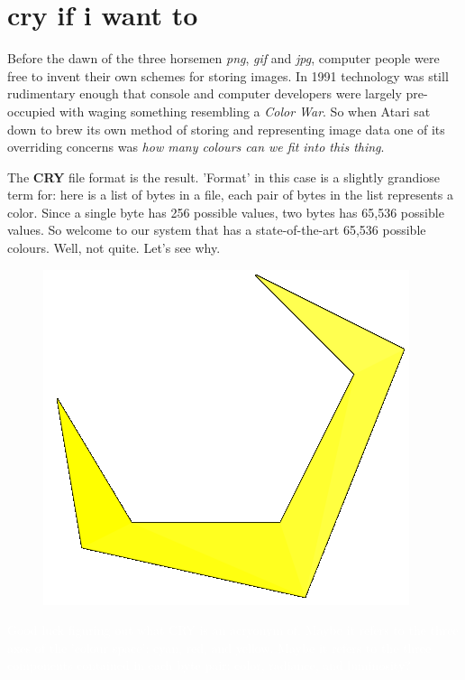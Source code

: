\chapter{cry if i want to} 
\label{sec:listing}
\lstset{style=68KStyle}
\lhead[tempest 2000]{}
Before the dawn of the three horsemen \textit{png}, \textit{gif} and \textit{jpg}, computer people were free to invent their 
own schemes for storing images. In 1991 technology was still
rudimentary enough that console and computer developers were largely pre-occupied with waging something resembling a \textit{Color War}. So
when Atari sat down to brew its own method of storing and representing image data one of its overriding concerns was \textit{how many
colours can we fit into this thing}.

The \textbf{CRY} file format is the result. 'Format' in this case is a slightly grandiose term for: here is a list of bytes in a file,
each pair of bytes in the list represents a color. Since a single byte has 256 possible values, two bytes has 65,536 possible values.
So welcome to our system that has a state-of-the-art 65,536 possible colours. Well, not quite. Let's see why.

\begin{definition}
\setlength{\intextsep}{0pt}%
\setlength{\columnsep}{3pt}%
\begin{figure}
\includegraphics[width=\linewidth]{src/callout/clawt2k_t.png} 
\end{figure}
\small
\textcolor{white}{
Good luck figuring out what CRY is an acryonym of. Maybe it refers to the three axes of the 'colour space': cyan, red, and yellow. 
Maybe it refers to the three components contained in each byte pair: color, radiance, and luminosity?
}
\end{definition}

